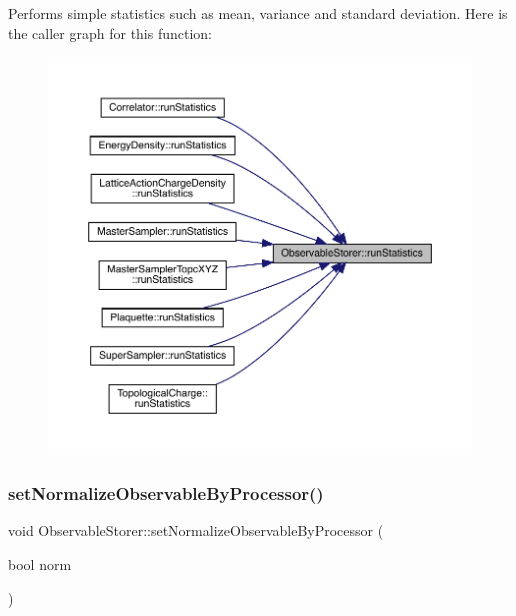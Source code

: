 Performs simple statistics such as mean, variance and standard deviation. Here is the caller graph for this function\+:\nopagebreak
\begin{figure}[H]
\begin{center}
\leavevmode
\includegraphics[width=350pt]{class_observable_storer_a41b3756b423d31c6535d2981ef92d1a1_icgraph}
\end{center}
\end{figure}
\mbox{\label{class_observable_storer_a6177ade7609fb0e4b739955eecba20e6}} 
\subsubsection{\texorpdfstring{setNormalizeObservableByProcessor()}{setNormalizeObservableByProcessor()}}
{\footnotesize\ttfamily void Observable\+Storer\+::set\+Normalize\+Observable\+By\+Processor (\begin{DoxyParamCaption}\item[{bool}]{norm }\end{DoxyParamCaption})\hspace{0.3cm}{\ttfamily [inline]}}

